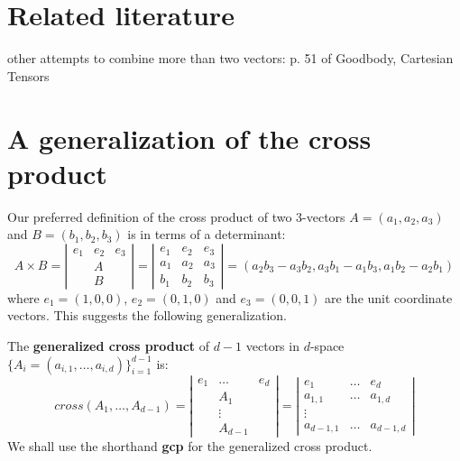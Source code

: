 \documentclass[10pt]{article}
\begin{document}
\section{Related literature}

other attempts to combine more than two vectors: p. 51 of Goodbody, Cartesian Tensors

\clearpage

\section{A generalization of the cross product}
\label{sec:gcp}

Our preferred definition of the cross product of two 3-vectors 
$A = (a_1,a_2,a_3)$ and $B = (b_1,b_2,b_3)$
is in terms of a determinant:
\[
A \times B = 
\left|
\begin{array}{ccc}
e_1 & e_2 & e_3 \\
& A \\
& B
\end{array}
\right|
=
\left|
\begin{array}{ccc}
e_1 & e_2 & e_3 \\
a_1 & a_2 & a_3 \\
b_1 & b_2 & b_3
\end{array}
\right|
= (a_2b_3 - a_3b_2, a_3b_1 - a_1b_3, a_1b_2 - a_2b_1)
\]
where $e_1 = (1,0,0)$, $e_2 = (0,1,0)$ and $e_3 = (0,0,1)$ are the 
unit coordinate vectors.
This suggests the following generalization.

\begin{defn2}
The {\bf generalized cross product} of $d-1$ vectors in $d$-space
$\{A_i = (a_{i,1},\ldots,a_{i,d})\}_{i=1}^{d-1}$ is:
\begin{equation}
\label{eqn:gcp}
cross (A_1,\ldots,A_{d-1}) = 
\left|
\begin{array}{ccc}
e_1 & \ldots & e_d \\
    & A_1 \\
    & \vdots \\
    & A_{d-1}
\end{array}
\right|
=
\left|
\begin{array}{ccc}
e_1 & \ldots & e_d \\
a_{1,1} & \ldots & a_{1,d} \\
\vdots \\
a_{d-1,1} & \ldots & a_{d-1,d} 
\end{array}
\right|
\end{equation}
We shall use the shorthand {\bf gcp} for the generalized cross product.
\end{defn2}
\end{document}
